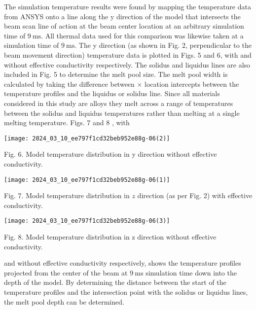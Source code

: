\documentclass[10pt]{article}
\begin{document}
The simulation temperature results were found by mapping the temperature data from ANSYS onto a line along the y direction of the model that intersects the beam scan line of action at the beam center location at an arbitrary simulation time of $9 \mathrm{~ms}$. All thermal data used for this comparison was likewise taken at a simulation time of $9 \mathrm{~ms}$. The y direction (as shown in Fig. 2, perpendicular to the beam movement direction) temperature data is plotted in Figs. 5 and 6, with and without effective conductivity respectively. The solidus and liquidus lines are also included in Fig. 5 to determine the melt pool size. The melt pool width is calculated by taking the difference between $\times$ location intercepts between the temperature profiles and the liquidus or solidus line. Since all materials considered in this study are alloys they melt across a range of temperatures between the solidus and liquidus temperatures rather than melting at a single melting temperature. Figs. 7 and 8 , with

\begin{center}
\texttt{[image: 2024\_03\_10\_ee797f1cd32beb952e88g-06(2)]}
\end{center}

Fig. 6. Model temperature distribution in y direction without effective conductivity.

\begin{center}
\texttt{[image: 2024\_03\_10\_ee797f1cd32beb952e88g-06(1)]}
\end{center}

Fig. 7. Model temperature distribution in $z$ direction (as per Fig. 2) with effective conductivity.

\begin{center}
\texttt{[image: 2024\_03\_10\_ee797f1cd32beb952e88g-06(3)]}
\end{center}

Fig. 8. Model temperature distribution in z direction without effective conductivity.

and without effective conductivity respectively, shows the temperature profiles projected from the center of the beam at $9 \mathrm{~ms}$ simulation time down into the depth of the model. By determining the distance between the start of the temperature profiles and the intersection point with the solidus or liquidus lines, the melt pool depth can be determined.
\end{document}
